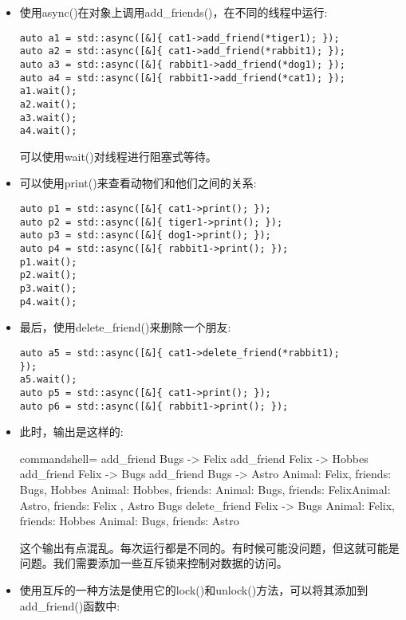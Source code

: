 \begin{itemize}
\item 
使用async()在对象上调用add\_friends()，在不同的线程中运行:

\begin{lstlisting}[style=styleCXX]
auto a1 = std::async([&]{ cat1->add_friend(*tiger1); });
auto a2 = std::async([&]{ cat1->add_friend(*rabbit1); });
auto a3 = std::async([&]{ rabbit1->add_friend(*dog1); });
auto a4 = std::async([&]{ rabbit1->add_friend(*cat1); });
a1.wait();
a2.wait();
a3.wait();
a4.wait();
\end{lstlisting}

可以使用wait()对线程进行阻塞式等待。

\item 
可以使用print()来查看动物们和他们之间的关系:

\begin{lstlisting}[style=styleCXX]
auto p1 = std::async([&]{ cat1->print(); });
auto p2 = std::async([&]{ tiger1->print(); });
auto p3 = std::async([&]{ dog1->print(); });
auto p4 = std::async([&]{ rabbit1->print(); });
p1.wait();
p2.wait();
p3.wait();
p4.wait();
\end{lstlisting}

\item 
最后，使用delete\_friend()来删除一个朋友:

\begin{lstlisting}[style=styleCXX]
auto a5 = std::async([&]{ cat1->delete_friend(*rabbit1);
});
a5.wait();
auto p5 = std::async([&]{ cat1->print(); });
auto p6 = std::async([&]{ rabbit1->print(); });
\end{lstlisting}

\item 
此时，输出是这样的:

\begin{tcblisting}{commandshell={}}
add_friend Bugs -> Felix
add_friend Felix -> Hobbes
add_friend Felix -> Bugs
add_friend Bugs -> Astro
Animal: Felix, friends: Bugs, Hobbes
Animal: Hobbes, friends: Animal: Bugs, friends:
FelixAnimal: Astro, friends: Felix
, Astro
Bugs
delete_friend Felix -> Bugs
Animal: Felix, friends: Hobbes
Animal: Bugs, friends: Astro
\end{tcblisting}

这个输出有点混乱。每次运行都是不同的。有时候可能没问题，但这就可能是问题。我们需要添加一些互斥锁来控制对数据的访问。

\item 
使用互斥的一种方法是使用它的lock()和unlock()方法，可以将其添加到add\_friend()函数中:


\end{itemize}
